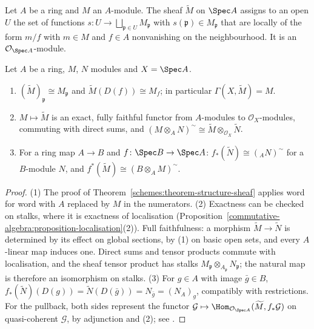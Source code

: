 \begin{definition}\label{schemes:definition-tilde}
Let $A$ be a ring and $M$ an $A$-module. The sheaf $\widetilde M$ on $\Spec A$ assigns to an open $U$ the set of functions
$s \colon U \to \bigsqcup_{\mathfrak{p} \in U}M_\mathfrak{p}$ with $s(\mathfrak{p}) \in M_\mathfrak{p}$ that are locally of the form $m/f$ with $m \in M$ and $f \in A$
nonvanishing on the neighbourhood. It is an $\mathcal{O}_{\Spec A}$-module.
\end{definition}

\begin{proposition}\label{schemes:proposition-tilde}
Let $A$ be a ring, $M$, $N$ modules and $X = \Spec A$.
\begin{enumerate}
\item $(\widetilde M)_\mathfrak{p} \cong M_\mathfrak{p}$ and $\widetilde M(D(f)) \cong M_f$; in particular $\Gamma(X, \widetilde M) = M$.
\item $M \mapsto \widetilde M$ is an exact, fully faithful functor from $A$-modules to $\mathcal{O}_X$-modules, commuting with direct sums, and
$(M \otimes_AN)^\sim \cong \widetilde M \otimes_{\mathcal{O}_X}\widetilde N$.
\item For a ring map $A \to B$ and $f \colon \Spec B \to \Spec A$: $f_*(\widetilde N) \cong ({}_AN)^\sim$ for a $B$-module $N$, and
$f^*(\widetilde M) \cong (B \otimes_AM)^\sim$.
\end{enumerate}
\end{proposition}

\begin{proof}
(1) The proof of Theorem~\ref{schemes:theorem-structure-sheaf} applies word for word with $A$ replaced by $M$ in the numerators. (2) Exactness can be
checked on stalks, where it is exactness of localisation (Proposition~\ref{commutative-algebra:proposition-localisation}(2)). Full faithfulness: a
morphism $\widetilde M \to \widetilde N$ is determined by its effect on global sections, by (1) on basic open sets, and every $A$-linear map induces one.
Direct sums and tensor products commute with localisation, and the sheaf tensor product has stalks $M_\mathfrak{p} \otimes_{A_\mathfrak{p}}N_\mathfrak{p}$; the
natural map is therefore an isomorphism on stalks. (3) For $g \in A$ with image $\bar g \in B$,
$f_*(\widetilde N)(D(g)) = \widetilde N(D(\bar g)) = N_{\bar g} = (N_A)_g$, compatibly with restrictions. For the pullback, both sides represent the functor
$\mathcal{G} \mapsto \Hom_{\mathcal{O}_{\Spec A}}(\widetilde M, f_*\mathcal{G})$ on quasi-coherent $\mathcal{G}$, by adjunction and (2); see
\cite[Proposition II.5.2]{hartshorne-ag}.
\end{proof}

